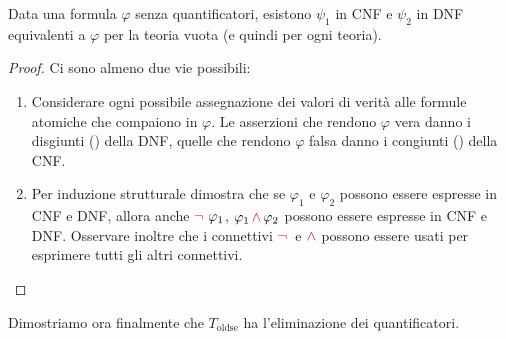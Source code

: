 \begin{lemma}
    Data una formula $\varphi$ \textcolor{green!50!black}{senza quantificatori}, esistono $\psi_1$ in CNF e $\psi_2$ in DNF equivalenti a $\varphi$ per la teoria vuota (e quindi per ogni teoria).
\end{lemma}

\begin{proof}
    Ci sono almeno due vie possibili:
    \begin{enumerate}
        \item Considerare ogni possibile assegnazione dei valori di verità alle formule atomiche che compaiono in $\varphi$. Le asserzioni che rendono $\varphi$ vera danno i disgiunti
        () della DNF, quelle che rendono $\varphi$ falsa danno i congiunti () della CNF.
        \item Per induzione strutturale dimostra che se $\varphi_1$ e $\varphi_2$ possono essere espresse in CNF e DNF, allora anche $\textcolor{purple}{\neg\,}\,\varphi_1$, $\varphi_1 \,\textcolor{purple}{\land}\, \varphi_2$ possono essere espresse in CNF e DNF.
        Osservare inoltre che i connettivi $\textcolor{purple}{\neg\,}$ e $\textcolor{purple}{\land}$ possono essere usati per esprimere tutti gli altri connettivi.
    \end{enumerate}
\end{proof}

Dimostriamo ora finalmente che $T_{\text{oldse}}$ ha l'eliminazione dei quantificatori.

